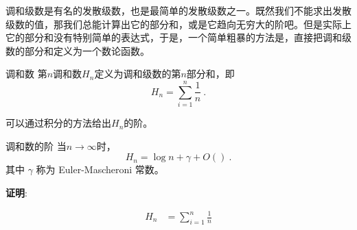 

调和级数是有名的发散级数，也是最简单的发散级数之一。既然我们不能求出发散级数的值，那我们总能计算出它的部分和，或是它趋向无穷大的阶吧。但是实际上它的部分和没有特别简单的表达式，于是，一个简单粗暴的方法是，直接把调和级数的部分和定义为一个数论函数。

\begin{definition}{调和数}
第$n$调和数$H_n$定义为调和级数的第$n$部分和，即
\begin{equation}
H_n = \sum_{i=1}^n\frac{1}{n}~.
\end{equation}
\end{definition}

可以通过积分的方法给出$H_n$的阶。

\begin{theorem}{调和数的阶}
当$n\to\infty$时，
\begin{equation}
H_n = \log n + \gamma + O() ~.
\end{equation}
其中 $\gamma$ 称为 Euler-Mascheroni 常数。
\end{theorem}

\textbf{证明}:

\begin{equation}

\begin{aligned}
H_n & = \sum_{i=1}^n\frac{1}{n}
\end{aligned}
\end{equation}
